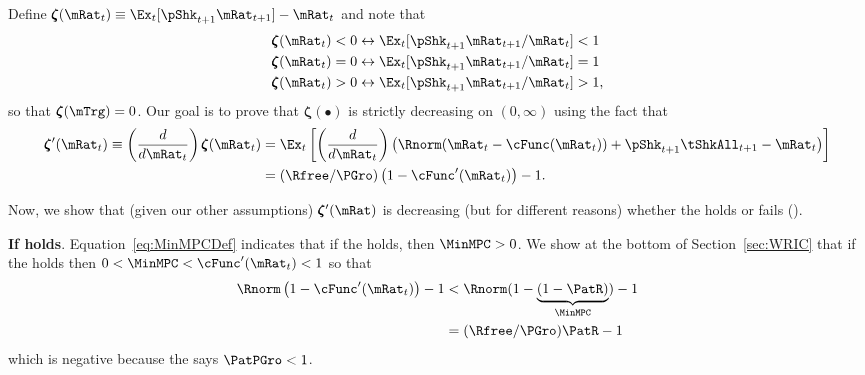 \documentclass[\econtexRoot/BufferStockTheory]{subfiles}
\begin{document}
Define \providecommand{\difFunc}{\pmb{\zeta}} $\difFunc(\mRat_t) \equiv 
\Ex_t[\pShk_{t+1}\mRat_{t+1}] - \mRat_t$ and note that
\begin{equation}\begin{gathered}\begin{aligned}\label{eq:difLevEquiv}
  \difFunc(\mRat_t) < 0 &\leftrightarrow \Ex_t[\pShk_{t+1}\mRat_{t+1}/\mRat_{t}] < 1 
                          \nonumber\\
  \difFunc(\mRat_t) = 0 &\leftrightarrow \Ex_t[\pShk_{t+1}\mRat_{t+1}/\mRat_{t}] = 1\\
  \difFunc(\mRat_t) > 0 &\leftrightarrow \Ex_t[\pShk_{t+1}\mRat_{t+1}/\mRat_{t}] > 
                          1,\nonumber
\end{aligned}\end{gathered}\end{equation}
so that $\difFunc(\mTrg)=0$. Our goal is to prove that $\difFunc(\bullet)$ is strictly 
decreasing on $(0,\infty)$ using the fact that
\begin{equation}\begin{gathered}\begin{aligned}
  \difFunc^{\prime}(\mRat_{t}) \equiv  \left( \frac{d}{d\mRat_{t}}\right) \difFunc(\mRat_t)  & = \Ex_{t}\left[
                                                                                               \left( \frac{d}{d\mRat_{t}}\right) \left( 
                                                                                               {\Rnorm}(\mRat_{t}-\cFunc(\mRat_{t}))+%
                                                                                               {\pShk}_{t+1}{\tShkAll}_{t+1} - {\mRat}_t\right) \right] \label{eq:difFuncDecreases} \\
                                                                                             & = (\Rfree/\PGro)\left(1-\cFunc^{\prime}({\mRat}_t)\right) - 1.  \notag
\end{aligned}\end{gathered}\end{equation}

Now, we show that (given our other assumptions) $\difFunc^{\prime}(\mRat)$ is decreasing (but for different reasons) whether the {\RIC} holds or fails (\cncl{\RIC}).

\textbf{If {\RIC} holds}. Equation~\eqref{eq:MinMPCDef} indicates that if the {\RIC} holds, then $\MinMPC >0$.  We show at the bottom of Section~\ref{sec:WRIC} that if the {\RIC} holds then $0 < \MinMPC < \cFunc^{\prime}(\mRat_{t}) < 1$ so that 
\begin{align*}
  \Rnorm\left(1-\cFunc^{\prime}({\mRat}_t)\right) - 1 & <  \Rnorm(1-\underbrace{(1-\PatR)}_{\MinMPC}) - 1  \\
                                                      & = (\Rfree/\PGro)\PatR - 1 
\end{align*}
which is negative because the {\GICRaw} says $\PatPGro < 1$.  
\end{document}
